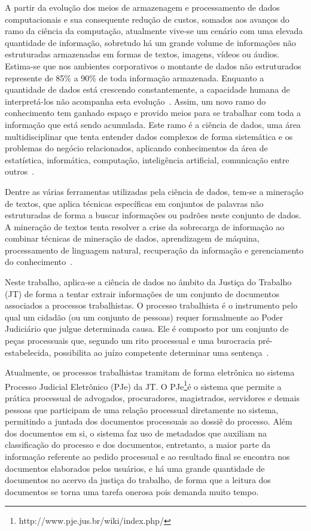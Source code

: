 \label{cap:Introdução}%
A partir da evolução dos meios de armazenagem e processamento de dados computacionais e sua consequente redução de custos, somados aos avanços do ramo da ciência da computação, atualmente vive-se um cenário com uma elevada quantidade de informação, sobretudo há um grande volume de informações não estruturadas armazenadas em formas de textos, imagens, vídeos ou áudios. Estima-se \cite{reviewportugues} que nos ambientes corporativos o montante de dados não estruturados represente de 85\% a 90\% de toda informação armazenada. Enquanto a quantidade de dados está crescendo constantemente, a capacidade humana de interpretá-los não acompanha esta evolução~\cite{thetextmininghandbook}. Assim, um novo ramo do conhecimento tem ganhado espaço e provido meios para se trabalhar com toda a informação que está sendo acumulada. Este ramo é a ciência de dados,  uma área multidisciplinar que tenta entender dados complexos de forma sistemática e os problemas do negócio relacionados, aplicando conhecimentos da área de estatística, informática, computação, inteligência artificial, comunicação entre outros~\cite{artigodatascience}.

Dentre as várias ferramentas utilizadas pela ciência de dados, tem-se a mineração de textos, que aplica técnicas específicas em conjuntos de palavras não estruturadas de forma a buscar informações ou padrões neste conjunto de dados. A mineração de textos tenta resolver a crise da sobrecarga de informação ao combinar técnicas de mineração de dados, aprendizagem de máquina, processamento de linguagem natural, recuperação da informação e gerenciamento do conhecimento~\cite{thetextmininghandbook}.  

Neste trabalho, aplica-se a ciência de dados no âmbito da Justiça do Trabalho (JT) de forma a tentar extrair informações de um conjunto de documentos associados a processos trabalhistas. O processo trabalhista é o instrumento pelo qual um cidadão (ou um conjunto de pessoas) requer formalmente ao Poder Judiciário que julgue determinada causa. Ele é composto por um conjunto de peças processuais que, segundo um rito processual e uma burocracia pré-estabelecida, possibilita ao juízo competente determinar uma sentença~\cite{tgp}.

Atualmente, os processos trabalhistas tramitam de forma eletrônica no sistema Processo Judicial Eletrônico (PJe) da JT. O PJe\footnote{http://www.pje.jus.br/wiki/index.php/}é o sistema que permite a prática processual de advogados, procuradores,  magistrados, servidores e demais pessoas que participam de uma relação processual diretamente no sistema, permitindo a juntada dos documentos processuais ao dossiê do processo. Além dos documentos em si, o sistema faz uso de metadados que auxiliam na classificação do processo e dos documentos, entretanto, a maior parte da informação referente ao pedido processual e ao resultado final se encontra nos documentos elaborados pelos usuários, e há uma grande quantidade de documentos no acervo da justiça do trabalho, de forma que a leitura dos documentos se torna uma tarefa onerosa pois demanda muito tempo. 

